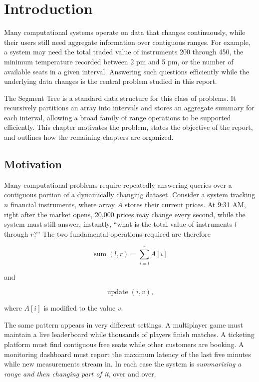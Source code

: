 \documentclass[
  11pt,
  a4paper,
  twoside=false,
  numbers=noenddot,
  headings=big,
  parskip=half,
  toc=bibliography,
  toc=listof,
  bibliography=totoc
]{scrreprt}
\newcounter{example}[chapter]
\begin{document}
\setcounter{page}{1}
\chapter{Introduction}
\label{ch:intro}

Many computational systems operate on data that changes continuously, while their users still need aggregate information over contiguous ranges. For example, a system may need the total traded value of instruments 200 through 450, the minimum temperature recorded between 2 pm and 5 pm, or the number of available seats in a given interval. Answering such questions efficiently while the underlying data changes is the central problem studied in this report.

The Segment Tree is a standard data structure for this class of problems. It recursively partitions an array into intervals and stores an aggregate summary for each interval, allowing a broad family of range operations to be supported efficiently.\cite{clrs,cpalgorithms} This chapter motivates the problem, states the objective of the report, and outlines how the remaining chapters are organized.

\section{Motivation}\label{sec:motivation}
Many computational problems require repeatedly answering queries over a contiguous portion of a dynamically changing dataset. Consider a system tracking $n$ financial instruments, where array $A$ stores their current prices. At 9:31 AM, right after the market opens, 20{,}000 prices may change every second, while the system must still answer, instantly, ``what is the total value of instruments $l$ through $r$?'' The two fundamental operations required are therefore

\begin{equation}
\operatorname{sum}(l,r) = \sum_{i=l}^{r} A[i]
\label{eq:sum}
\end{equation}

and

\begin{equation}
\operatorname{update}(i,v),
\label{eq:update}
\end{equation}

where $A[i]$ is modified to the value $v$.

The same pattern appears in very different settings. A multiplayer game must maintain a live leaderboard while thousands of players finish matches. A ticketing platform must find contiguous free seats while other customers are booking. A monitoring dashboard must report the maximum latency of the last five minutes while new measurements stream in. In each case the system is \emph{summarizing a range and then changing part of it}, over and over.
\end{document}
